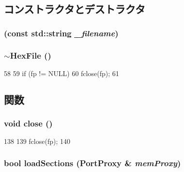 \subsection{コンストラクタとデストラクタ}
\hypertarget{classHexFile_a33e7f7c56c9fb712309be679983e06a4}{
\subsubsection[{HexFile}]{ (const std::string {\em \_\-filename})}}
\label{classHexFile_a33e7f7c56c9fb712309be679983e06a4}
\hypertarget{classHexFile_af446931b55a207b6e7e8f0b1795ee2a3}{
\subsubsection[{$\sim$HexFile}]{\setlength{\rightskip}{0pt plus 5cm}$\sim${\bf HexFile} ()}}
\label{classHexFile_af446931b55a207b6e7e8f0b1795ee2a3}



\begin{DoxyCode}
58 {
59     if (fp != NULL)
60         fclose(fp);
61 }
\end{DoxyCode}


\subsection{関数}
\hypertarget{classHexFile_a5ae591df94fc66ccb85cbb6565368bca}{
\subsubsection[{close}]{\setlength{\rightskip}{0pt plus 5cm}void close ()}}
\label{classHexFile_a5ae591df94fc66ccb85cbb6565368bca}



\begin{DoxyCode}
138 {
139     fclose(fp);
140 }
\end{DoxyCode}
\hypertarget{classHexFile_a767f217f0e08a42dbda4b40f1c827c61}{
\subsubsection[{loadSections}]{\setlength{\rightskip}{0pt plus 5cm}bool loadSections ({\bf PortProxy} \& {\em memProxy})}}
\label{classHexFile_a767f217f0e08a42dbda4b40f1c827c61}



